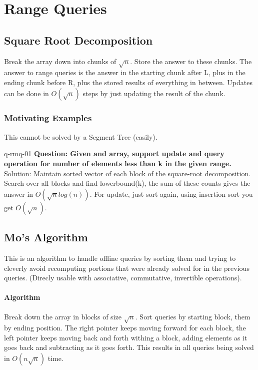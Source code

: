\chapter{Range Queries}



\section{Square Root Decomposition}

Break the array down into chunks of $\sqrt{n}$. Store the answer to these chunks. The answer to range queries is the answer in the starting chunk after L, plus in the ending chunk before R, plus the stored results of everything in between. Updates can be done in $O(\sqrt{n})$ steps by just updating the result of the chunk.

\subsection{Motivating Examples}

This cannot be solved by a Segment Tree (easily).

\begin{example}{q-rmq-01}
    \textbf{Question: Given and array, support update and query operation for number of elements less than k in the given range.} \\
    Solution: Maintain sorted vector of each block of the square-root decomposition. Search over all blocks and find lowerbound(k), the sum of these counts gives the answer in $O(\sqrt{n} log(n))$. For update, just sort again, using insertion sort you get $O(\sqrt{n})$.
\end{example}



\section{Mo's Algorithm}

This is an algorithm to handle offline queries by sorting them and trying to cleverly avoid recomputing portions that were already solved \relax for in the previous queries.
(Direcly usable with associative, commutative, invertible operations).

\subsubsection{Algorithm}
Break down the array in blocks of size $\sqrt{n}$. Sort queries by starting block, them by ending position. The right pointer keeps moving forward for each block, the left pointer keeps moving back and forth withing a block, adding elements as it goes back and subtracting as it goes forth. This results in all queries being solved in $O(n\sqrt{n})$ time.

